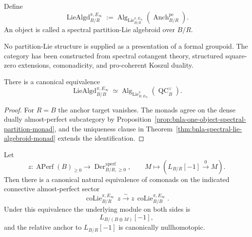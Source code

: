 \begin{definition}
\label{def:bnla-spectral-partition-lie-algebroids}
Define
\[
\boxed{
    \operatorname{LieAlgd}^{\pi,E_\infty}_{B/R}
    :=
    \operatorname{Alg}_{\operatorname{Lie}^{\pi,E_\infty}_{B/R}}
    \left(\operatorname{Anch}^{\mathrm{pc}}_{B/R}\right).}
\]
An object is called a spectral partition-Lie algebroid over $B/R$.
\end{definition}

No partition-Lie structure is supplied as a presentation of a formal
groupoid.  The category has been constructed from spectral cotangent theory,
structured square-zero extensions, comonadicity, and pro-coherent Koszul
duality.

\begin{corollary}
\label{cor:bnla-spectral-one-object-recovery}
There is a canonical equivalence
\[
    \operatorname{LieAlgd}^{\pi,E_\infty}_{B/B}
    \simeq
    \operatorname{Alg}_{\operatorname{Lie}^{\pi}_{B,E_\infty}}
    \left(\operatorname{QC}^{\vee}_B\right).
\]
\end{corollary}

\begin{proof}
For $R=B$ the anchor target vanishes.  The monads agree on the dense
dually almost-perfect subcategory by
Proposition~\ref{prop:bnla-one-object-spectral-partition-monad}, and the
uniqueness clause in
Theorem~\ref{thm:bnla-spectral-lie-algebroid-monad} extends the identification.
\end{proof}

\begin{lemma}
\label{lem:bnla-zero-derivation-subcomonad}
Let
\[
    z:
    \operatorname{APerf}(B)_{\geq0}
    \longrightarrow
    \operatorname{Der}^{\mathrm{aperf}}_{B/R,\geq0},
    \qquad
    M\longmapsto
    \left(L_{B/R}[-1]\xrightarrow{0}M\right).
\]
Then there is a canonical natural equivalence of comonads on the indicated
connective almost-perfect sector
\[
\boxed{
    \operatorname{coLie}^{\pi,E_\infty}_{B/R}\,z
    \xrightarrow{\sim}
    z\,\operatorname{coLie}^{\pi,E_\infty}_{B/B}.}
\]
Under this equivalence the underlying module on both sides is
\[
    L_{B/(B\oplus M)}[-1],
\]
and the relative anchor to $L_{B/R}[-1]$ is canonically nullhomotopic.
\end{lemma}

